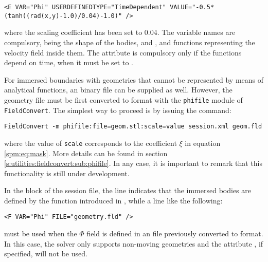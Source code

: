 \begin{lstlisting}[style=XMLStyle]
    <E VAR="Phi" USERDEFINEDTYPE="TimeDependent" VALUE="-0.5*(tanh((rad(x,y)-1.0)/0.04)-1.0)" />
\end{lstlisting}

where the scaling coefficient has been set to 0.04. The variable names are
compulsory, being  the shape of the bodies, and ,
 and  functions representing the velocity field inside
them. The attribute  is compulsory only if the functions
depend on time, when it must be set to .

For immersed boundaries with geometries that cannot be represented by means of
analytical functions, an  binary file can be supplied as well.
However, the geometry file must be first converted to  format with
the \texttt{phifile} module of \texttt{FieldConvert}. The simplest way to
proceed is by issuing the command:

\begin{lstlisting}[style=BashInputStyle]
    FieldConvert -m phifile:file=geom.stl:scale=value session.xml geom.fld
\end{lstlisting}

where the value of \texttt{scale} corresponds to the coefficient $\xi$ in
equation \eqref{spm:eq:mask}. More details can be found in section
\ref{s:utilities:fieldconvert:sub:phifile}. In any case, it is important to
remark that this functionality is still under development.

In the  block of the session file, the line
 indicates that the immersed bodies are defined by
the function introduced in , while a line like the following:

\begin{lstlisting}[style=XMLStyle]
    <F VAR="Phi" FILE="geometry.fld" />
\end{lstlisting}

must be used when the $\Phi$ field is defined in an  file
previously converted to  format. In this case, the solver only
supports non-moving geometries and the attribute
, if specified, will not be used.

